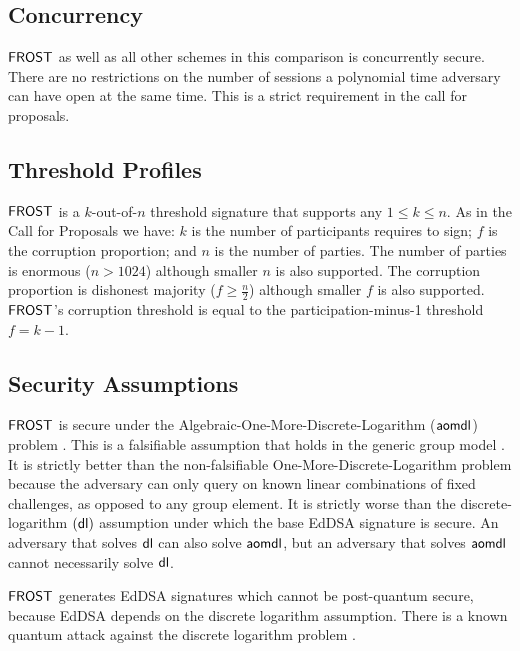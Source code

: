 \subsection{Concurrency}\label{section:comparisons:concurrency}
$\mathsf{FROST}$ as well as all other schemes in this comparison is concurrently secure.  
There are no restrictions on the number of sessions a polynomial time adversary can have open at the same time.
This is a strict requirement in the call for proposals.

\subsection{Threshold Profiles}
$\mathsf{FROST}$ is a $k$-out-of-$n$ threshold signature that supports any $1 \leq k \leq n$.
As in the Call for Proposals \cite{} we have: $k$ is the number of participants requires to sign; $f$ is the corruption proportion; and  $n$ is the number of parties.
The number of parties is enormous ($n > 1024$) although smaller $n$ is also supported.
The corruption proportion is dishonest majority ($f \geq \frac{n}{2}$) although smaller $f$ is also supported.
$\mathsf{FROST}$'s corruption threshold is equal to the participation-minus-1 threshold $f = k-1$.


\subsection{Security Assumptions}\label{section:comparisons:security}
$\mathsf{FROST}$ is secure under the Algebraic-One-More-Discrete-Logarithm ($\mathsf{aomdl}$) problem \cite{NickRS21}.
This is a falsifiable assumption that holds in the generic group model \cite{CorettiDG18,BauerFP21}.
It is strictly better than the non-falsifiable One-More-Discrete-Logarithm problem \cite{BellareNPS03} because the adversary can only query on known linear combinations of fixed challenges,
as opposed to any group element.
It is strictly worse than the discrete-logarithm $(\mathsf{dl})$ assumption under which the base EdDSA signature is secure.
An adversary that solves $\mathsf{dl}$ can also solve $\mathsf{aomdl}$, but an adversary that solves $\mathsf{aomdl}$ cannot necessarily solve $\mathsf{dl}$.

$\mathsf{FROST}$ generates EdDSA signatures which cannot be post-quantum secure, because EdDSA depends on the discrete logarithm assumption.
There is a known quantum attack against the discrete logarithm problem \cite{Shor99}.



